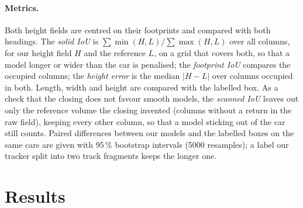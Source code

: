 \documentclass[runningheads,a4paper]{llncs}
\begin{document}
\paragraph{Metrics.} Both height fields are centred on their footprints and compared with both headings. The
\emph{solid IoU} is $\sum \min(H, L) / \sum \max(H, L)$ over all columns, for our height field $H$ and the reference
$L$, on a grid that covers both, so that a model longer or wider than the car is penalised; the \emph{footprint IoU}
compares the occupied columns; the \emph{height error} is the median $|H - L|$ over columns occupied in both. Length, width and height are compared with the labelled box. As a check that the closing does not favour
smooth models, the \emph{scanned IoU} leaves out only the reference volume the closing invented (columns without a
return in the raw field), keeping every other column, so that a model sticking out of the car still counts. Paired
differences between our models and the labelled boxes on the same cars are given with 95\,\% bootstrap intervals
(5000 resamples); a label our tracker split into two track fragments keeps the longer one.

\section{Results}\label{sec:results}



\sloppy
\end{document}
